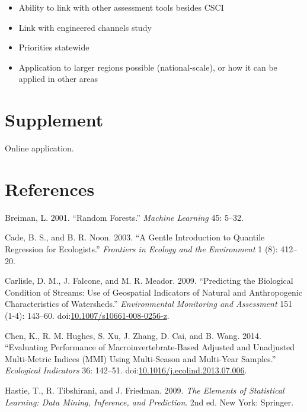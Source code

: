 \documentclass[]{article}
\providecommand{\tightlist}{%
  \setlength{\itemsep}{0pt}\setlength{\parskip}{0pt}}
\begin{document}
\begin{itemize}
  \begin{itemize}
  \tightlist
  \item
    Ability to link with other assessment tools besides CSCI
  \item
    Link with engineered channels study
  \item
    Priorities statewide
  \item
    Application to larger regions possible (national-scale), or how it
    can be applied in other areas
  \end{itemize}
\end{itemize}

\section{Supplement}\label{supplement}

Online application.

\section*{References}\label{references}

\hypertarget{refs}{}
\hypertarget{ref-Breiman01}{}
Breiman, L. 2001. ``Random Forests.'' \emph{Machine Learning} 45: 5--32.

\hypertarget{ref-Cade03}{}
Cade, B. S., and B. R. Noon. 2003. ``A Gentle Introduction to Quantile
Regression for Ecologists.'' \emph{Frontiers in Ecology and the
Environment} 1 (8): 412--20.

\hypertarget{ref-Carlisle09}{}
Carlisle, D. M., J. Falcone, and M. R. Meador. 2009. ``Predicting the
Biological Condition of Streams: Use of Geospatial Indicators of Natural
and Anthropogenic Characteristics of Watersheds.'' \emph{Environmental
Monitoring and Assessment} 151 (1-4): 143--60.
doi:\href{https://doi.org/10.1007/s10661-008-0256-z}{10.1007/s10661-008-0256-z}.

\hypertarget{ref-Chen14}{}
Chen, K., R. M. Hughes, S. Xu, J. Zhang, D. Cai, and B. Wang. 2014.
``Evaluating Performance of Macroinvertebrate-Based Adjusted and
Unadjusted Multi-Metric Indices (MMI) Using Multi-Season and Multi-Year
Samples.'' \emph{Ecological Indicators} 36: 142--51.
doi:\href{https://doi.org/10.1016/j.ecolind.2013.07.006}{10.1016/j.ecolind.2013.07.006}.

\hypertarget{ref-Hastie09}{}
Hastie, T., R. Tibshirani, and J. Friedman. 2009. \emph{The Elements of
Statistical Learning: Data Mining, Inference, and Prediction}. 2nd ed.
New York: Springer.
\end{document}
